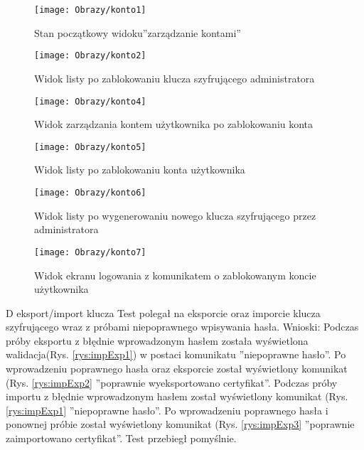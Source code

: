 \begin{enumerate*}
				\begin{figure}[ht!]
					\begin{minipage}{0.2\textwidth}
						\texttt{[image: Obrazy/konto1]}
						\caption{Stan początkowy widoku''zarządzanie kontami'' }
						\label{rys:zarzadzanieKontem1}
					\end{minipage}
				\begin{minipage}{0.2\textwidth}
					\texttt{[image: Obrazy/konto2]}
					\caption{Widok listy po zablokowaniu klucza szyfrującego administratora }
					\label{rys:zarzadzanieKontem2}
				\end{minipage}
			
		
			
			\begin{minipage}{0.2\textwidth}
				\texttt{[image: Obrazy/konto4]}
				\caption{Widok zarządzania kontem użytkownika po zablokowaniu konta }
				\label{rys:zarzadzanieKontem4}
			\end{minipage}
			
			
			\begin{minipage}{0.2\textwidth}
				\texttt{[image: Obrazy/konto5]}
				\caption{Widok listy po zablokowaniu konta użytkownika}
				\label{rys:zarzadzanieKontem5}
			\end{minipage}
		
		
			\begin{minipage}{0.2\textwidth}
			\texttt{[image: Obrazy/konto6]}
			\caption{Widok listy po wygenerowaniu nowego klucza szyfrującego przez administratora}
			\label{rys:zarzadzanieKontem6}
		\end{minipage}
	
		\begin{minipage}{0.2\textwidth}
		\texttt{[image: Obrazy/konto7]}
		\caption{Widok ekranu logowania z komunikatem o zablokowanym koncie użytkownika}
		\label{rys:zarzadzanieKontem7}
	\end{minipage}

			
		\end{figure}
		
	\item  D eksport/import klucza
	Test polegał na eksporcie oraz imporcie klucza szyfrującego wraz z próbami niepoprawnego wpisywania hasła.
	Wnioski: Podczas próby eksportu z błędnie wprowadzonym hasłem została wyświetlona walidacja(Rys. \ref{rys:impExp1}) w postaci komunikatu ''niepoprawne hasło''. Po wprowadzeniu poprawnego hasła oraz eksporcie został wyświetlony komunikat (Rys. \ref{rys:impExp2} ''poprawnie wyeksportowano certyfikat''. Podczas próby importu z błędnie wprowadzonym hasłem został wyświetlony komunikat (Rys. \ref{rys:impExp1} ''niepoprawne hasło''. Po wprowadzeniu poprawnego hasła i ponownej próbie został wyświetlony komunikat (Rys. \ref{rys:impExp3} ''poprawnie zaimportowano certyfikat''. Test przebiegł pomyślnie.
	

\end{enumerate*}
